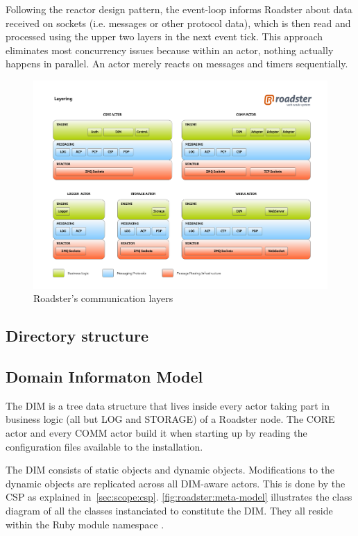 Following the reactor design pattern, the event-loop informs Roadster about
data received on sockets (i.e. \zmq messages or other protocol data), which is
then read and processed using the upper two layers in the next event
tick. This approach eliminates most concurrency issues because within an actor,
nothing actually happens in parallel. An actor merely reacts on messages and
timers sequentially.

\begin{figure}[]
	\includegraphics[trim=1.95cm 2.5cm 1.65cm 2.8cm, clip=true, width=\textwidth]{img/roadster_layering.pdf}
	\caption{Roadster's communication layers}
	\label{fig:roadster:layers}
\end{figure}


\subsection{Directory structure}


\subsection{Domain Informaton Model}
The \acrfull{DIM} is a tree data structure that lives inside every actor taking part in business logic (all but LOG and STORAGE) of a Roadster
node. The CORE actor and every COMM actor build it when starting up by reading the configuration
files available to the installation.

The DIM consists of static objects and dynamic objects. Modifications to the dynamic
objects are replicated across all DIM-aware actors. This is done by the \gls{CSP} as explained in~\autoref{sec:scope:csp}.
\autoref{fig:roadster:meta-model} illustrates the class diagram of
all the classes instanciated to constitute the DIM. They all reside within the
Ruby module namespace .

